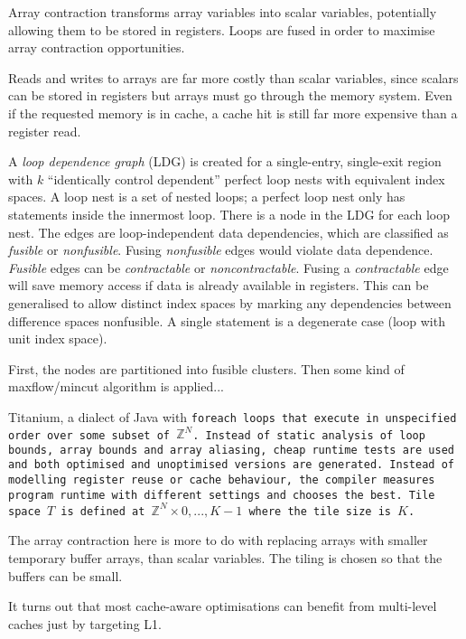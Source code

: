 Array contraction transforms array variables into scalar variables,
potentially allowing them to be stored in registers.
Loops are fused in order to maximise array contraction opportunities.

Reads and writes to arrays are far more costly than scalar variables, since
scalars can be stored in registers but arrays must go through the memory system.
Even if the requested memory is in cache, a cache hit is still far more expensive than a register read.

A \emph{loop dependence graph} (LDG) is created for a single-entry, single-exit region with $k$ ``identically control dependent'' perfect loop nests with equivalent index spaces.
A loop nest is a set of nested loops; a perfect loop nest only has statements inside the innermost loop.
There is a node in the LDG for each loop nest.
The edges are loop-independent data dependencies, which are classified as \emph{fusible} or \emph{nonfusible}.
Fusing \emph{nonfusible} edges would violate data dependence. \emph{Fusible} edges can be \emph{contractable} or \emph{noncontractable}.
Fusing a \emph{contractable} edge will save memory access if data is already available in registers.
This can be generalised to allow distinct index spaces by marking any dependencies between difference spaces nonfusible. A single statement is a degenerate case (loop with unit index space).

First, the nodes are partitioned into fusible clusters. Then some kind of maxflow/mincut algorithm is applied...


Titanium, a dialect of Java with \tt{foreach} loops that execute in unspecified order over some subset of $\mathbb{Z}^N$.
Instead of static analysis of loop bounds, array bounds and array aliasing, cheap runtime tests are used
and both optimised and unoptimised versions are generated.
Instead of modelling register reuse or cache behaviour, the compiler measures program runtime with different settings and chooses the best.
Tile space $T$ is defined at $\mathbb{Z}^N \times {0, ... , K - 1}$ where the tile size is $K$.

The array contraction here is more to do with replacing arrays with smaller temporary buffer arrays, than scalar variables.
The tiling is chosen so that the buffers can be small.

It turns out that most cache-aware optimisations can benefit from multi-level caches just by targeting L1.

